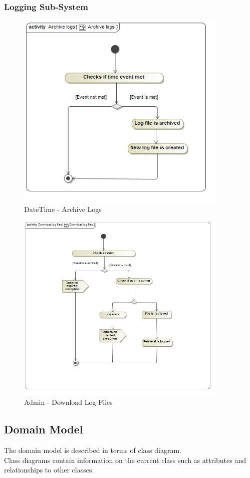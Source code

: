 \documentclass{article}
\begin{document}
			\subsubsection{Logging Sub-System}
				\begin{figure}[H]
					\includegraphics[width=4in, center]{../Diagrams/Process Specifications/Logging subsystem/Archive logs.jpg}
					\caption{DateTime - Archive Logs}
				\end{figure}
				\begin{figure}[H]
					\includegraphics[width=4in, center]{../Diagrams/Process Specifications/Logging subsystem/Download log files.jpg}
					\caption{Admin - Download Log Files}
				\end{figure}
			
		\cleardoublepage
		\subsection{Domain Model}\label{subsec:domainmodel}
		The domain model is described in terms of class diagram.\\ Class diagrams contain information on the current class such as attributes and relationships to other classes.
		
\end{document}
